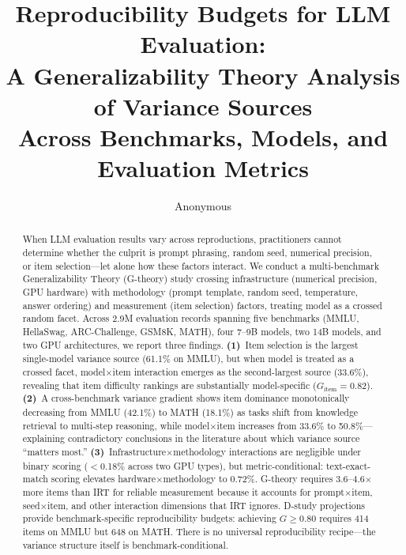 \documentclass[11pt,a4paper]{article}
\title{Reproducibility Budgets for LLM Evaluation:\\A Generalizability Theory Analysis of Variance Sources\\Across Benchmarks, Models, and Evaluation Metrics}
\author{Anonymous}
\date{}
\newcommand{\Gcoeff}{\ensuremath{G}}
\begin{document}
\maketitle

\begin{abstract}
When LLM evaluation results vary across reproductions, practitioners cannot determine whether the culprit is prompt phrasing, random seed, numerical precision, or item selection---let alone how these factors interact.
We conduct a multi-benchmark Generalizability Theory (G-theory) study crossing infrastructure (numerical precision, GPU hardware) with methodology (prompt template, random seed, temperature, answer ordering) and measurement (item selection) factors, treating model as a crossed random facet.
Across 2.9M evaluation records spanning five benchmarks (MMLU, HellaSwag, ARC-Challenge, GSM8K, MATH), four 7--9B models, two 14B models, and two GPU architectures, we report three findings.
\textbf{(1)}~Item selection is the largest single-model variance source (61.1\% on MMLU), but when model is treated as a crossed facet, model$\times$item interaction emerges as the second-largest source (33.6\%), revealing that item difficulty rankings are substantially model-specific ($\Gcoeff_\text{item}=0.82$).
\textbf{(2)}~A cross-benchmark variance gradient shows item dominance monotonically decreasing from MMLU (42.1\%) to MATH (18.1\%) as tasks shift from knowledge retrieval to multi-step reasoning, while model$\times$item increases from 33.6\% to 50.8\%---explaining contradictory conclusions in the literature about which variance source ``matters most.''
\textbf{(3)}~Infrastructure$\times$methodology interactions are negligible under binary scoring ($<$0.18\% across two GPU types), but metric-conditional: text-exact-match scoring elevates hardware$\times$methodology to 0.72\%.
G-theory requires 3.6--4.6$\times$ more items than IRT for reliable measurement because it accounts for prompt$\times$item, seed$\times$item, and other interaction dimensions that IRT ignores.
D-study projections provide benchmark-specific reproducibility budgets: achieving $\Gcoeff\geq0.80$ requires 414 items on MMLU but 648 on MATH.
There is no universal reproducibility recipe---the variance structure itself is benchmark-conditional.
\end{abstract}

\end{document}
